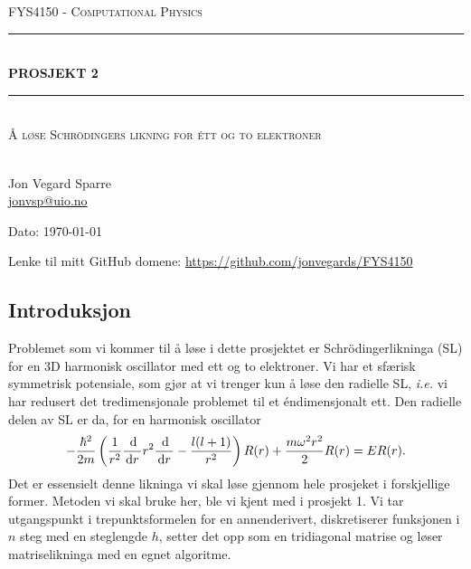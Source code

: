 \documentclass[norsk, 11pt]{article}
\begin{document}
\begin{titlepage}
\begin{center}

\textsc{\Large FYS4150 - Computational Physics}\\[0.5cm]
\rule{\linewidth}{0.5mm} \\[0.4cm]
{ \huge \bfseries  PROSJEKT 2}\\[0.10cm]
\rule{\linewidth}{0.5mm} \\[1.5cm]
\textsc{\Large Å løse Schrödingers likning for étt og to elektroner}\\[1.5cm]
\textsc{}\\[1.5cm]


\begin{minipage}{0.49\textwidth}
    \begin{center} \large
        Jon Vegard Sparre\\ \url{jonvsp@uio.no} \\[0.8cm]
    \end{center}
\end{minipage}


\vfill

\large{Dato: \today}

\end{center}
\end{titlepage}


Lenke til mitt GitHub domene: \url{https://github.com/jonvegards/FYS4150}

\subsection*{Introduksjon}
Problemet som vi kommer til å løse i dette prosjektet er Schrödingerlikninga (SL) for en 3D harmonisk oscillator med ett og to elektroner. Vi har et sfærisk symmetrisk potensiale, som gjør at vi trenger kun å løse den radielle SL, \emph{i.e.} vi har redusert det tredimensjonale problemet til et éndimensjonalt ett. Den radielle delen av SL er da, for en harmonisk oscillator
$$ -\frac{\hbar^2}{2m} \left(  \frac{1}{r^2} \frac{\, {\text d}}{\, {\rm d}r\,}r^2 \frac{\, {\text d}}{\, {\rm d}r\,} - \frac{l(l+1)}{r^2} \right)R(r) + \frac{m\omega^2r^2}{2} R(r) = E R(r).$$
Det er essensielt denne likninga vi skal løse gjennom hele prosjeket i forskjellige former. Metoden vi skal bruke her, ble vi kjent med i prosjekt 1. Vi tar utgangspunkt i trepunktsformelen for en annenderivert, diskretiserer funksjonen i $n$ steg med en steglengde $h$, setter det opp som en tridiagonal matrise og løser matriselikninga med en egnet algoritme.
\end{document}

